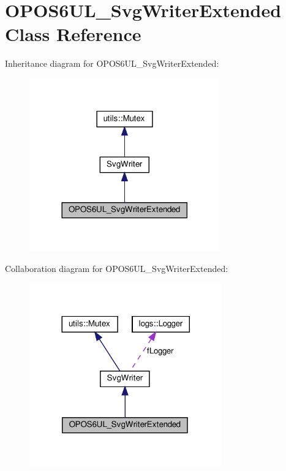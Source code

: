 \hypertarget{classOPOS6UL__SvgWriterExtended}{}\section{O\+P\+O\+S6\+U\+L\+\_\+\+Svg\+Writer\+Extended Class Reference}
\label{classOPOS6UL__SvgWriterExtended}


Inheritance diagram for O\+P\+O\+S6\+U\+L\+\_\+\+Svg\+Writer\+Extended\+:
\nopagebreak
\begin{figure}[H]
\begin{center}
\leavevmode
\includegraphics[width=233pt]{classOPOS6UL__SvgWriterExtended__inherit__graph}
\end{center}
\end{figure}


Collaboration diagram for O\+P\+O\+S6\+U\+L\+\_\+\+Svg\+Writer\+Extended\+:
\nopagebreak
\begin{figure}[H]
\begin{center}
\leavevmode
\includegraphics[width=236pt]{classOPOS6UL__SvgWriterExtended__coll__graph}
\end{center}
\end{figure}
